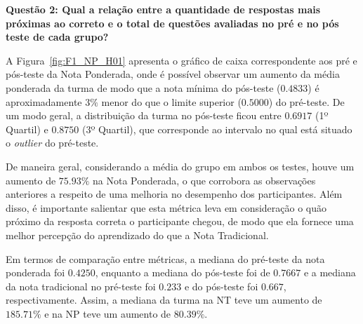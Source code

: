 \textbf{Questão 2: Qual a relação entre a quantidade de respostas mais próximas ao correto e o total de questões avaliadas no pré e no pós teste de cada grupo?}

A Figura~\ref{fig:F1_NP_H01} apresenta o gráfico de caixa correspondente aos pré e pós-teste da Nota Ponderada, onde é possível observar um aumento da média ponderada da turma de modo que a nota mínima do pós-teste ($0.4833$) é aproximadamente $3\%$ menor do que o limite superior ($0.5000$) do pré-teste. De um modo geral, a distribuição da turma no pós-teste ficou entre $0.6917$ (1º Quartil) e $0.8750$ (3º Quartil), que corresponde ao intervalo no qual está situado o \textit{outlier} do pré-teste.

De maneira geral, considerando a média do grupo em ambos os testes, houve um aumento de $75.93\%$ na Nota Ponderada, o que corrobora as observações anteriores a respeito de uma melhoria no desempenho dos participantes. Além disso, é importante salientar que esta métrica leva em consideração o quão próximo da resposta correta o participante chegou, de modo que ela fornece uma melhor percepção do aprendizado do que a Nota Tradicional.

Em termos de comparação entre métricas, a mediana do pré-teste da nota ponderada foi $0.4250$, enquanto a mediana do pós-teste foi de $0.7667$ e a mediana da nota tradicional no pré-teste foi $0.233$ e do pós-teste foi $0.667$, respectivamente. Assim, a mediana da turma na NT teve um aumento de $185.71\%$ e na NP teve um aumento de $80.39\%$.


